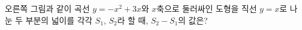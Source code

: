\noindent\begin{minipage}[t]{0.58\linewidth}\vspace{0pt}\raggedright 오른쪽 그림과 같이 곡선 $y=-x^2+3x$와 $x$축으로 둘러싸인 도형을 직선 $y=x$로 나눈 두 부분의 넓이를 각각 $S_1$, $S_2$라 할 때, $S_2-S_1$의 값은?\end{minipage}\hfill\begin{minipage}[t]{0.4\linewidth}\vspace{0pt}\centering \resizebox{\ifdim\width>\linewidth\linewidth\else\width\fi}{!}{}\end{minipage}\par
{}
